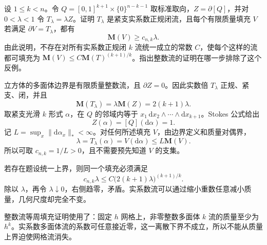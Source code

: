 \begin{exercise}\label{g3:ex:real-current-isoperimetric-amplitude}
	设 \(1\le k<n\)。令 \(Q=[0,1]^{k+1}\times\{0\}^{n-k-1}\) 取标准取向，\(Z=\partial[Q]\)，并对 \(0<\lambda<1\) 令 \(T_\lambda=\lambda Z\)。证明 \(T_\lambda\) 是紧支实系数正规闭流，且每个有限质量填充 \(V\) 若满足 \(\partial V=T_\lambda\)，都有
	\[
	\mathbf M(V)\ge c_{n,k}\lambda.
	\]
	由此说明，不存在对所有实系数正规闭 \(k\) 流统一成立的常数 \(C\)，使每个这样的流都可填充为
	\(\mathbf M(V)\le C\mathbf M(T)^{(k+1)/k}\)。指出整数流的证明在哪一步排除了这个反例。
\end{exercise}
\begin{solution}
	立方体的多面体边界是有限质量整数流，且 \(\partial Z=0\)。因此实数倍 \(T_\lambda\) 正规、紧支、闭，并且
	\[
	\mathbf M(T_\lambda)=\lambda\mathbf M(Z)=2(k+1)\lambda.
	\]
	取紧支光滑 \(k\) 形式 \(\alpha\)，在 \(Q\) 的邻域内等于
	\(x_1\,\mathrm dx_2\wedge\cdots\wedge\mathrm dx_{k+1}\)。Stokes 公式给出
	\[
	Z(\alpha)=[Q](\mathrm d\alpha)=1.
	\]
	记 \(L=\sup_x\|\mathrm d\alpha_x\|_*<\infty\)。对任何所述填充 \(V\)，由边界定义和质量对偶界，
	\[
	\lambda=T_\lambda(\alpha)=V(\mathrm d\alpha)
	\le L\mathbf M(V).
	\]
	所以可取 \(c_{n,k}=1/L>0\)，且不需要预先知道 \(V\) 的支集。

	若存在题设统一上界，则同一个填充必须满足
	\[
	c_{n,k}\lambda
	\le C\bigl(2(k+1)\lambda\bigr)^{(k+1)/k}.
	\]
	除以 \(\lambda\)，再令 \(\lambda\downarrow0\)，右侧趋零，矛盾。实系数流可以通过缩小重数任意减小质量，几何尺度却完全不变。

	整数流等周填充证明使用了：固定 \(h\) 网格上，非零整数多面体 \(k\) 流的质量至少为 \(h^k\)。实系数多面体流的系数可任意接近零，这一离散下界不成立，所以不能从质量上界迫使网格流消失。
\end{solution}

